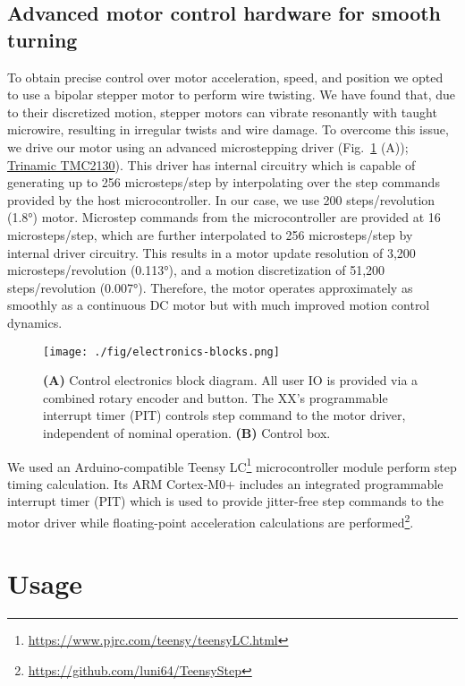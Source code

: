 \documentclass[11pt,a4paper]{article}
\begin{document}
\subsection{Advanced motor control hardware for smooth turning}
To obtain precise control over motor acceleration, speed, and position we opted
to use a bipolar stepper motor to perform wire twisting. We have found that,
due to their discretized motion, stepper motors can vibrate resonantly with
taught microwire, resulting in irregular twists and wire damage. To overcome
this issue, we drive our motor using an advanced microstepping driver
(Fig.~\ref{f:ctrl-box} (A));
\href{https://www.trinamic.com/products/integrated-circuits/details/tmc2100/}{Trinamic
TMC2130}). This driver has internal circuitry which is capable of generating up
to 256 microsteps/step by interpolating over the step commands provided by the
host microcontroller. In our case, we use 200 steps/revolution (\ang{1.8})
motor. Microstep commands from the microcontroller are provided at 16
microsteps/step, which are further interpolated to 256 microsteps/step by
internal driver circuitry. This results in a motor update resolution of 3,200
microsteps/revolution (\ang{0.113}), and a motion discretization of 51,200
steps/revolution (\ang{0.007}). Therefore, the motor operates approximately as
smoothly as a continuous DC motor but with much improved motion control
dynamics.

\begin{figure}
\centering
\texttt{[image: ./fig/electronics-blocks.png]}
\caption{\textbf{(A)} Control electronics block diagram. All user IO is
    provided via a combined rotary encoder and button. The XX's programmable
    interrupt timer (PIT) controls step command to the motor driver, independent of
    nominal operation. \textbf{(B)} Control box.}
\label{f:ctrl-box}
\end{figure}

We used an Arduino-compatible Teensy
LC\footnote{\url{https://www.pjrc.com/teensy/teensyLC.html}} microcontroller
module perform step timing calculation. Its ARM Cortex-M0+ includes an
integrated programmable interrupt timer (PIT) which is used to provide
jitter-free step commands to the motor driver while floating-point acceleration
calculations are
performed\footnote{\url{https://github.com/luni64/TeensyStep}}.

\section{Usage}
\end{document}
